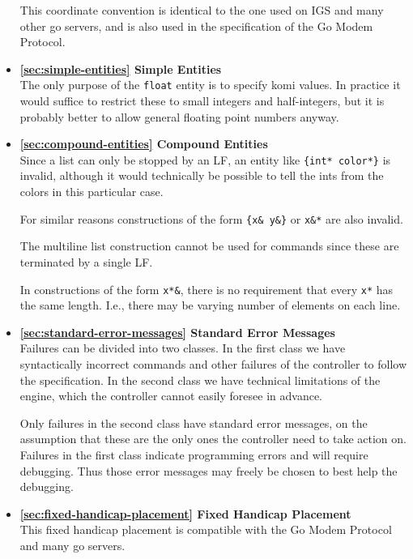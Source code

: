\documentclass[a4paper]{article}
\begin{document}
\begin{itemize}
  This coordinate convention is identical to the one used on IGS and
  many other go servers, and is also used in the specification of the
  Go Modem Protocol.
  
\item \textbf{\ref{sec:simple-entities} Simple Entities} \\
  The only purpose of the \texttt{float} entity is to specify komi
  values. In practice it would suffice to restrict these to small
  integers and half-integers, but it is probably better to allow
  general floating point numbers anyway.

\item \textbf{\ref{sec:compound-entities} Compound Entities} \\
  Since a list can only be stopped by an LF, an entity like
  \texttt{\{int* color*\}} is invalid, although it would technically
  be possible to tell the ints from the colors in this particular
  case.
  
  For similar reasons constructions of the form \texttt{\{x\& y\&\}}
  or \texttt{x\&*} are also invalid.

  The multiline list construction cannot be used for commands since these
  are terminated by a single LF.
  
  In constructions of the form \texttt{x*\&}, there is no requirement
  that every \texttt{x*} has the same length. I.e., there may be
  varying number of elements on each line.
  
\item \textbf{\ref{sec:standard-error-messages} Standard Error Messages} \\
  Failures can be divided into two classes. In the first class we have
  syntactically incorrect commands and other failures of the
  controller to follow the specification. In the second class we have
  technical limitations of the engine, which the controller cannot
  easily foresee in advance.
  
  Only failures in the second class have standard error messages, on
  the assumption that these are the only ones the controller need to
  take action on. Failures in the first class indicate programming
  errors and will require debugging. Thus those error messages may
  freely be chosen to best help the debugging.

\item \textbf{\ref{sec:fixed-handicap-placement} Fixed Handicap Placement} \\
  This fixed handicap placement is compatible with the Go Modem
  Protocol and many go servers.
  

\end{itemize}
\end{document}
